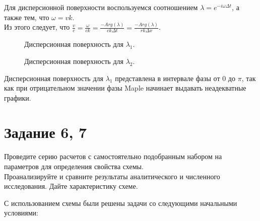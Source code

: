 \documentclass[a4paper, 14pt]{extreport}
\begin{document}
\newpage Для дисперсионной поверхности воспользуемся соотношением $\lambda = e^{-i\omega \Delta t}$, а также тем, что $\omega = vk$.\\ 
Из этого следует, что $\frac{v}{c} = \frac{\omega}{ck} = \frac{-Arg(\lambda)}{ck\Delta t} = \frac{-Arg(\lambda)}{rk\Delta x}$.
\begin{figure}[h]
\caption{Дисперсионная поверхность для $\lambda_1$.}
\label{ris:dispepov1}
\end{figure}

\begin{figure}[h]
\caption{Дисперсионная поверхность для $\lambda_2$.}
\label{ris:dispepov2}
\end{figure}

\par Дисперсионная поверхность для $\lambda_1$ представлена в интервале фазы от 0 до $\pi$, так как при отрицательном значении фазы Maple начинает выдавать неадекватные графики.





\newpage
\section*{Задание 6, 7}
Проведите серию расчетов с самостоятельно подобранным набором на параметров для определения свойства схемы.\\
Проанализируйте и сравните результаты аналитического и численного исследования. Дайте характеристику схеме.
\par С использованием схемы были решены задачи со следующими начальными условиями:
\end{document}

